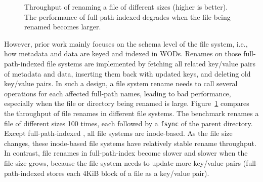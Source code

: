 \begin{figure}[t]
    \centering
    \caption[The performance of file renames in full-path-indexed file systems]{\label{fig:file_rename_intro}
        Throughput of renaming a file of different sizes (higher is better).
        The performance of full-path-indexed \betrfsThree
        degrades when the file being renamed becomes larger.}
\end{figure}

However, prior work mainly focuses on the schema level of the file system, i.e.,
how metadata and data are keyed and indexed in WODs.
Renames on those full-path-indexed file systems are implemented by fetching all
related key/value pairs of metadata and data,
inserting them back with updated keys, and deleting old key/value pairs.
In such a design, a file system rename needs to call several operations for each
affected full-path names, leading to bad performance,
especially when the file or directory being renamed is large.
Figure~\ref{fig:file_rename_intro} compares the throughput of file renames in
different file systems.
The benchmark renames a file of different sizes 100 times, each followed by a
\texttt{fsync} of the parent directory.
Except full-path-indexed \betrfsThree, all file systems are inode-based.
As the file size changes, these inode-based file systems have relatively
stable rename throughput.
In contrast, file renames in full-path-index \betrfsThree become slower and
slower when the file size grows,
because the file system needs to update more key/value pairs
(full-path-indexed \betrfsThree stores each 4KiB block of a file as
a key/value pair).

